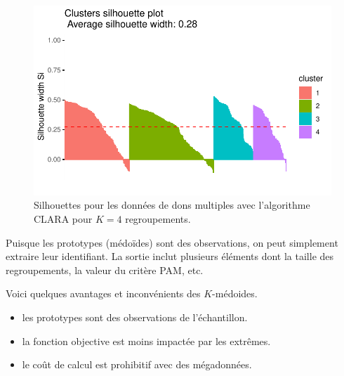 \documentclass[
  11pt,
  letterpaper,
]{scrbook}
\newenvironment{Shaded}{\begin{snugshade}}{\end{snugshade}}
\newcommand{\CommentTok}[1]{\textcolor[rgb]{0.37,0.37,0.37}{#1}}
\newcommand{\DecValTok}[1]{\textcolor[rgb]{0.68,0.00,0.00}{#1}}
\newcommand{\NormalTok}[1]{\textcolor[rgb]{0.00,0.23,0.31}{#1}}
\newcommand{\OtherTok}[1]{\textcolor[rgb]{0.00,0.23,0.31}{#1}}
\newcommand{\SpecialCharTok}[1]{\textcolor[rgb]{0.37,0.37,0.37}{#1}}
\providecommand{\tightlist}{%
  \setlength{\itemsep}{0pt}\setlength{\parskip}{0pt}}\usepackage{longtable,booktabs,array}
\theoremstyle{definition}
\theoremstyle{remark}
\begin{document}
\begin{figure}[ht!]

{\centering \includegraphics{regroupements_files/figure-pdf/fig-clarasilhouette-1.pdf}

}

\caption{\label{fig-clarasilhouette}Silhouettes pour les données de dons
multiples avec l'algorithme CLARA pour \(K=4\) regroupements.}

\end{figure}

Puisque les prototypes (médoïdes) sont des observations, on peut
simplement extraire leur identifiant. La sortie inclut plusieurs
éléments dont la taille des regroupements, la valeur du critère PAM,
etc.

\begin{Shaded}
\end{Shaded}

Voici quelques avantages et inconvénients des \(K\)-médoides.

\begin{itemize}
\tightlist
\item
  les prototypes sont des observations de l'échantillon.
\item
  la fonction objective est moins impactée par les extrêmes.
\item
  le coût de calcul est prohibitif avec des mégadonnées.
\end{itemize}
\end{document}
